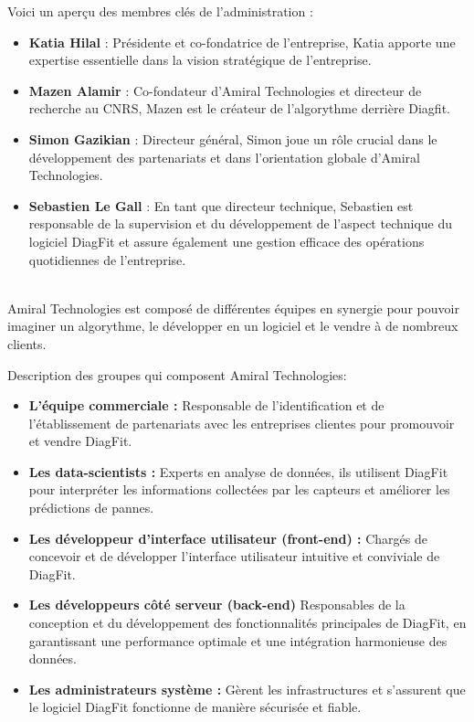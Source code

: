 Voici un aperçu des membres clés de l'administration :
\begin{itemize}
    \item \textbf{Katia Hilal} : Présidente et co-fondatrice de l'entreprise, Katia apporte une expertise essentielle dans la vision stratégique de l'entreprise.
    \item \textbf{Mazen Alamir} : Co-fondateur d'Amiral Technologies et directeur de recherche au CNRS, Mazen est le créateur de l'algorythme derrière Diagfit.
    \item \textbf{Simon Gazikian} : Directeur général, Simon joue un rôle crucial dans le développement des partenariats et dans l'orientation globale d'Amiral Technologies.
    \item \textbf{Sebastien Le Gall} : En tant que directeur technique, Sebastien est responsable de la supervision et du développement de l'aspect technique du logiciel DiagFit et assure également une gestion efficace des opérations quotidiennes de l'entreprise.
\end{itemize}\phantom{vide pour separer}\\

Amiral Technologies est composé de différentes équipes en synergie pour pouvoir imaginer un algorythme, le développer en un logiciel et le vendre à de nombreux clients.

Description des groupes qui composent Amiral Technologies:
\begin{itemize}
    \item \textbf{L'équipe commerciale :} Responsable de l'identification et de l'établissement de partenariats avec les entreprises clientes pour promouvoir et vendre DiagFit.
    \item \textbf{Les data-scientists :} Experts en analyse de données, ils utilisent DiagFit pour interpréter les informations collectées par les capteurs et améliorer les prédictions de pannes.
    \item \textbf{Les développeur d'interface utilisateur (front-end) :} Chargés de concevoir et de développer l'interface utilisateur intuitive et conviviale de DiagFit.
    \item \textbf{Les développeurs côté serveur (back-end)} Responsables de la conception et du développement des fonctionnalités principales de DiagFit, en garantissant une performance optimale et une intégration harmonieuse des données.
    \item \textbf{Les administrateurs système :} Gèrent les infrastructures et s'assurent que le logiciel DiagFit fonctionne de manière sécurisée et fiable.
\end{itemize}


